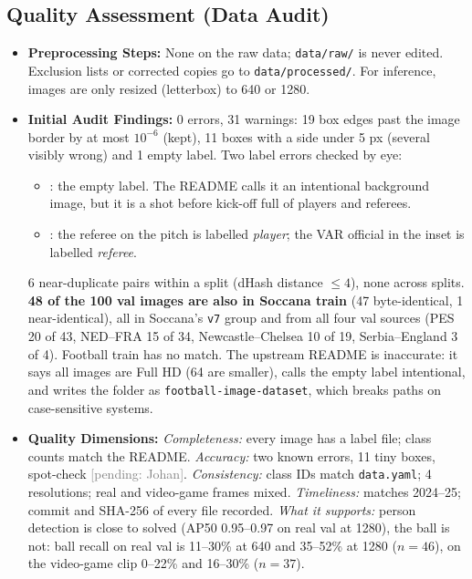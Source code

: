 \documentclass[11pt, a4paper]{article}
\newcommand{\pending}[1]{\textcolor{gray}{[pending: #1]}}
\begin{document}
\subsection{Quality Assessment (Data Audit)}
\begin{itemize}
    \item \textbf{Preprocessing Steps:} None on the raw data; \texttt{data/raw/} is never edited. Exclusion lists or corrected copies go to \texttt{data/processed/}. For inference, images are only resized (letterbox) to 640 or 1280.
    \item \textbf{Initial Audit Findings:} 0 errors, 31 warnings: 19 box edges past the image border by at most $10^{-6}$ (kept), 11 boxes with a side under 5 px (several visibly wrong) and 1 empty label. Two label errors checked by eye:
    \begin{itemize}
        \item {}: the empty label. The README calls it an intentional background image, but it is a shot before kick-off full of players and referees.
        \item {}: the referee on the pitch is labelled \emph{player}; the VAR official in the inset is labelled \emph{referee}.
    \end{itemize}
    6 near-duplicate pairs within a split (dHash distance $\le 4$), none across splits. \textbf{48 of the 100 val images are also in Soccana train} (47 byte-identical, 1 near-identical), all in Soccana's \texttt{v7} group and from all four val sources (PES 20 of 43, NED--FRA 15 of 34, Newcastle--Chelsea 10 of 19, Serbia--England 3 of 4). Football train has no match. The upstream README is inaccurate: it says all images are Full HD (64 are smaller), calls the empty label intentional, and writes the folder as \texttt{football-image-dataset}, which breaks paths on case-sensitive systems.
    \item \textbf{Quality Dimensions:} \emph{Completeness:} every image has a label file; class counts match the README. \emph{Accuracy:} two known errors, 11 tiny boxes, spot-check \pending{Johan}. \emph{Consistency:} class IDs match \texttt{data.yaml}; 4 resolutions; real and video-game frames mixed. \emph{Timeliness:} matches 2024--25; commit and SHA-256 of every file recorded. \emph{What it supports:} person detection is close to solved (AP50 0.95--0.97 on real val at 1280), the ball is not: ball recall on real val is 11--30\% at 640 and 35--52\% at 1280 ($n=46$), on the video-game clip 0--22\% and 16--30\% ($n=37$).
\end{itemize}
\end{document}

